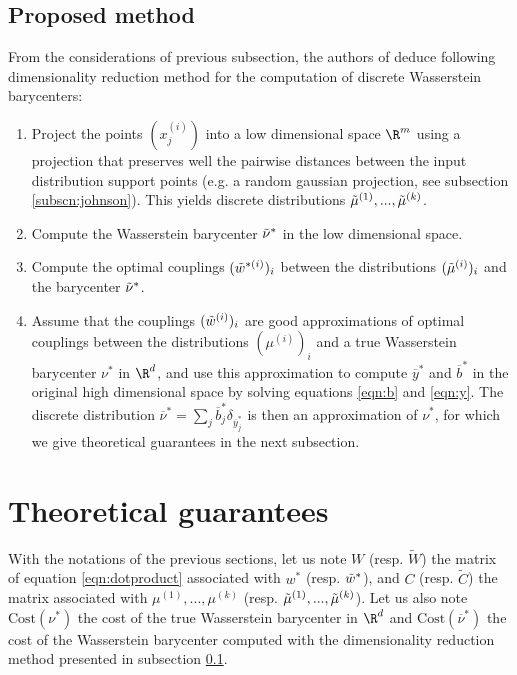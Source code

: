 \documentclass[11pt,a4paper]{article}
\begin{document}
\subsection{Proposed method}
\label{subscn:method}

From the considerations of previous subsection, the authors of \cite{izzo_dimensionality_2021} deduce following dimensionality reduction method for the computation of discrete Wasserstein barycenters:

\begin{enumerate}
    \item Project the points $(x^{(i)}_j)$ into a low dimensional space $\R^m$ using a projection that preserves well the pairwise distances between the input distribution support points (e.g. a random gaussian projection, see subsection \ref{subscn:johnson}). This yields discrete distributions $\Tilde{\mu}^{(1)}, ..., \Tilde{\mu}^{(k)}$.
    \item Compute the Wasserstein barycenter $\Tilde{\nu}^*$ in the low dimensional space.
    \item Compute the optimal couplings $(\Tilde{w}^{*(i)})_i$ between the distributions $(\Tilde{\mu}^{(i)})_i$ and the barycenter $\Tilde{\nu}^*$.
    \item Assume that the couplings $(\Tilde{w}^{(i)})_i$ are good approximations of optimal couplings between the distributions $(\mu^{(i)})_i$ and a true Wasserstein barycenter $\nu^*$ in $\R^d$, and use this approximation to compute $\overline{y}^*$ and $\overline{b}^*$ in the original high dimensional space by solving equations \ref{eqn:b} and \ref{eqn:y}. The discrete distribution $\overline{\nu}^* = \sum_j \overline{b}^*_j \delta_{\overline{y}^*_j}$ is then an approximation of $\nu^*$, for which we give theoretical guarantees in the next subsection.
\end{enumerate}

\section{Theoretical guarantees}

With the notations of the previous sections, let us note $W$ (resp. $\widetilde{W}$) the matrix of equation \ref{eqn:dotproduct} associated with $w^*$ (resp. $\Tilde{w}^*$), and $C$ (resp. $\widetilde{C}$) the matrix associated with $\mu^{(1)}, ..., \mu^{(k)}$ (resp. $\Tilde{\mu}^{(1)}, ..., \Tilde{\mu}^{(k)}$). Let us also note $\text{Cost}(\nu^*)$ the cost of the true Wasserstein barycenter in $\R^d$ and $\text{Cost}(\overline{\nu}^*)$ the cost of the Wasserstein barycenter computed with the dimensionality reduction method presented in subsection \ref{subscn:method}.
\end{document}
